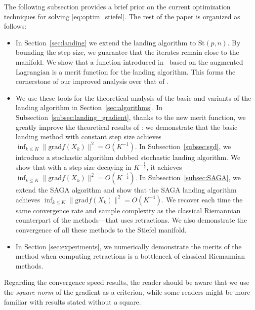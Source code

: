 \documentclass[twoside,11pt]{article}
\newcommand{\grad}{{\mathrm{grad}}}
\newcommand{\stiefel}{{\mathrm{St}(p, n)}}
\newcommand{\revision}[1]{{#1}}
\begin{document}
The following subsection provides a brief prior on the current optimization techniques for solving \eqref{eq:optim_stiefel}. The rest of the paper is organized as follows:
\begin{itemize}
  \item{In Section~\ref{sec:landing} we extend the landing algorithm to $\stiefel$. By bounding the step size, we guarantee that the iterates remain close to the manifold. We show that a function introduced in~\citep{gao2019parallelizable} based on the augmented Lagrangian is a merit function for the landing algorithm. \revision{This forms the cornerstone of our improved analysis over that of \cite{ablin2022fast}.}}
  \item{We use these tools for the theoretical analysis of the basic and variants of the landing algorithm in Section~\ref{sec:algorithms}. In Subsection~\ref{subsec:landing_gradient}, thanks to the
  new merit function, we greatly improve the theoretical results of \cite{ablin2022fast}: we demonstrate that the basic landing method with constant step size achieves $\inf_{k\leq K}\|\grad f(X_k)\|^2 =O(K^{-1})$. In Subsection~\ref{subsec:sgd}, we introduce a stochastic algorithm dubbed stochastic landing algorithm. We show that with a step size decaying in $K^{-\frac12}$, it achieves $\inf_{k\leq K}\|\grad f(X_k)\|^2 =O(K^{-\frac12})$. In Subsection~\ref{subsec:SAGA}, we extend the SAGA algorithm and show that the SAGA landing algorithm achieves $\inf_{k\leq K}\|\grad f(X_k)\|^2 =O(K^{-1})$. We recover each time the same convergence rate and sample complexity as the classical Riemannian counterpart of the methods---that uses retractions. \revision{We also demonstrate the convergence of all these methods to the Stiefel manifold.}}
  \item{In Section \ref{sec:experiments}, we numerically demonstrate the merits of the method when computing retractions is a bottleneck of classical Riemannian methods.}
\end{itemize}

Regarding the convergence speed results, the reader should be aware that we use the \emph{square norm} of the gradient as a criterion, while some readers might be more familiar with results stated without a square.
\end{document}
